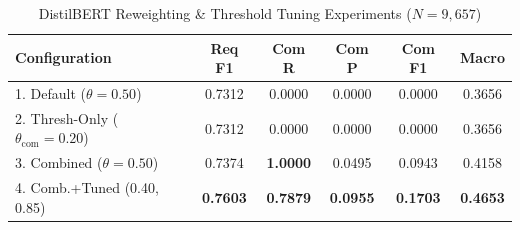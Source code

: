 \documentclass[conference]{IEEEtran}
\begin{document}
\begin{table}[htbp]
\caption{DistilBERT Reweighting \& Threshold Tuning Experiments ($N=9,657$)}
\begin{center}
\setlength{\tabcolsep}{2.5pt}
\begin{tabular}{lccccc}
\toprule
\textbf{Configuration} & \textbf{Req F1} & \textbf{Com R} & \textbf{Com P} & \textbf{Com F1} & \textbf{Macro} \\
\midrule
1. Default ($\theta=0.50$) & 0.7312 & 0.0000 & 0.0000 & 0.0000 & 0.3656 \\
2. Thresh-Only ($\theta_{\text{com}}=0.20$) & 0.7312 & 0.0000 & 0.0000 & 0.0000 & 0.3656 \\
3. Combined ($\theta=0.50$) & 0.7374 & \textbf{1.0000} & 0.0495 & 0.0943 & 0.4158 \\
4. Comb.+Tuned (0.40, 0.85) & \textbf{0.7603} & \textbf{0.7879} & \textbf{0.0955} & \textbf{0.1703} & \textbf{0.4653} \\
\bottomrule
\end{tabular}
\label{tab:weighted}
\end{center}
\end{table}
\end{document}
